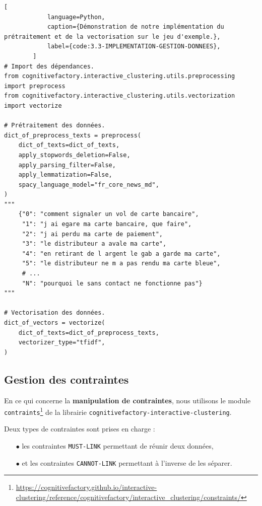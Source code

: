 		\begin{lstlisting}[
			language=Python,
			caption={Démonstration de notre implémentation du prétraitement et de la vectorisation sur le jeu d'exemple.},
			label={code:3.3-IMPLEMENTATION-GESTION-DONNEES},
		]
# Import des dépendances.
from cognitivefactory.interactive_clustering.utils.preprocessing import preprocess
from cognitivefactory.interactive_clustering.utils.vectorization import vectorize

# Prétraitement des données.
dict_of_preprocess_texts = preprocess(
    dict_of_texts=dict_of_texts,
    apply_stopwords_deletion=False,
    apply_parsing_filter=False,
    apply_lemmatization=False,
    spacy_language_model="fr_core_news_md",
)
"""
    {"0": "comment signaler un vol de carte bancaire",
     "1": "j ai egare ma carte bancaire, que faire",
     "2": "j ai perdu ma carte de paiement",
     "3": "le distributeur a avale ma carte",
     "4": "en retirant de l argent le gab a garde ma carte",
     "5": "le distributeur ne m a pas rendu ma carte bleue",
     # ...
     "N": "pourquoi le sans contact ne fonctionne pas"}
"""

# Vectorisation des données.
dict_of_vectors = vectorize(
    dict_of_texts=dict_of_preprocess_texts,
    vectorizer_type="tfidf",
)
		\end{lstlisting}
		
		\subsection{Gestion des contraintes}
		\label{section:3.3.2-GESTION-DES-CONTRAINTES}
		
		En ce qui concerne la \textbf{manipulation de contraintes}, nous utilisons le module \texttt{contraints}\footnote{\url{https://cognitivefactory.github.io/interactive-clustering/reference/cognitivefactory/interactive_clustering/constraints/}} de la librairie \texttt{cognitivefactory-interactive-clustering}.
		
		Deux types de contraintes sont prises en charge :
		
		\begin{itemize}
			\item[\(\bullet\)] les contraintes \texttt{MUST-LINK} permettant de réunir deux données,
			\item[\(\bullet\)] et les contraintes \texttt{CANNOT-LINK} permettant à l'inverse de les séparer.
		\end{itemize}

